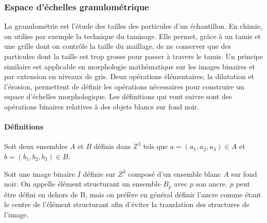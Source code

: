 \subsubsection{Espace d'échelles granulométrique}
\label{sec:EA:rehaussement:echelle:granulometrie}
La granulométrie est l'étude des tailles des particules d'un échantillon. En chimie, on utilise par exemple la technique du tamisage. Elle permet, grâce à un tamis et une grille dont on contrôle la taille du maillage, de ne conserver que des particules dont la taille est trop grosse pour passer à travers le tamis. Un principe similaire est applicable en morphologie mathématique sur les images binaires et par extension en niveaux de gris. 
Deux opérations élémentaires, la dilatation et l'érosion, permettent de définir les opérations nécessaires pour construire un espace d'échelles morphologique. Les définitions qui vont suivre sont des opérations binaires relatives à des objets blancs sur fond noir.
\paragraph{Définitions}
Soit deux ensembles $A$ et $B$ définis dans $\mathbb{Z}^3$ tels que $a=(a_1,a_2,a_3)  \in A$ et $b=(b_1,b_2,b_3) \in B$.

Soit une image binaire $I$ définie sur $Z^3$ composé d'un ensemble blanc $A$ sur fond noir. On appelle élément structurant un ensemble $B_p$ avec $p$ son ancre. $p$ peut être défini en dehors de B, mais on préfère en général définir l'ancre comme étant le centre de l'élément structurant afin d'éviter la translation des structures de l'image.
